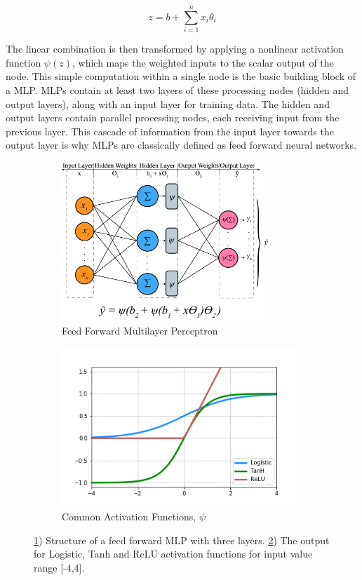     \begin{equation} \label{eq:lincomb}
        z = b + \sum_{i=1}^{n}  x_i \theta_i
    \end{equation}

The linear combination is then transformed by applying a nonlinear activation function $\psi(z)$, which maps the weighted inputs to the scalar output of the node. This simple computation within a single node is the basic building block of a MLP. MLPs contain at least two layers of these processing nodes (hidden and output layers), along with an input layer for training data. The hidden and output layers contain parallel processing nodes, each receiving input from the previous layer. This cascade of information from the input layer towards the output layer is why MLPs are classically defined as feed forward neural networks. 

\begin{figure}[h!]
    \centering
    \begin{subfigure}[b]{0.59\textwidth}
        \includegraphics[height = 6cm, width=\textwidth]{img/mlp.png}
        \caption{Feed Forward Multilayer Perceptron}
        \label{fig:mlp}
    \end{subfigure}
    \hfill
    \begin{subfigure}[b]{0.40\textwidth}
        \includegraphics[height = 6cm, width=\textwidth]{img/actfunc.png}
        \caption{Common Activation Functions, $\psi$}
        \label{fig:actfunc}
    \end{subfigure}
    \caption{\ref{fig:mlp}) Structure of a feed forward MLP with three layers. \ref{fig:actfunc}) The output for Logistic, Tanh and ReLU activation functions for input value range [-4,4].}\label{fig:mlp_actfunc}
\end{figure}


